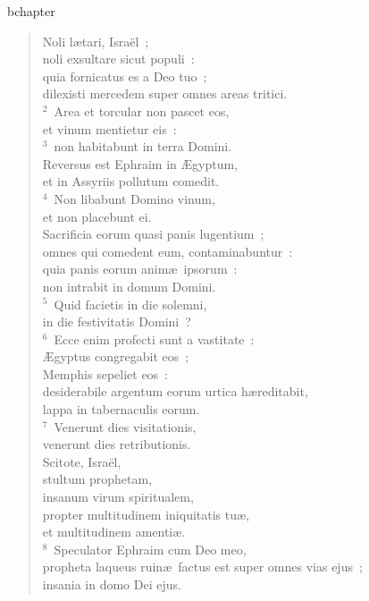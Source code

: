 bchapter\begin{flushleft}\begin{verse}\vspace{-19pt}Noli l\ae tari, Isra\"el~;\\ noli exsultare sicut populi~:\\ quia fornicatus es a Deo tuo~;\\ dilexisti mercedem super omnes areas tritici.\\
${}^{2}$~Area et torcular non pascet eos,\\ et vinum mentietur eis~:\\
${}^{3}$~non habitabunt in terra Domini.\\ Reversus est Ephraim in \AE gyptum,\\ et in Assyriis pollutum comedit.\\
${}^{4}$~Non libabunt Domino vinum,\\ et non placebunt ei.\\ Sacrificia eorum quasi panis lugentium~;\\ omnes qui comedent eum, contaminabuntur~:\\ quia panis eorum anim\ae\ ipsorum~:\\ non intrabit in domum Domini.\\
${}^{5}$~Quid facietis in die solemni,\\ in die festivitatis Domini~?\\
${}^{6}$~Ecce enim profecti sunt a vastitate~:\\ \AE gyptus congregabit eos~;\\ Memphis sepeliet eos~:\\ desiderabile argentum eorum urtica h\ae reditabit,\\ lappa in tabernaculis eorum.\\
${}^{7}$~Venerunt dies visitationis,\\ venerunt dies retributionis.\\ Scitote, Isra\"el,\\ stultum prophetam,\\ insanum virum spiritualem,\\ propter multitudinem iniquitatis tu\ae ,\\ et multitudinem amenti\ae .\\
${}^{8}$~Speculator Ephraim cum Deo meo,\\ propheta laqueus ruin\ae\ factus est super omnes vias ejus~;\\ insania in domo Dei ejus.\\

\end{verse}
\end{flushleft}
